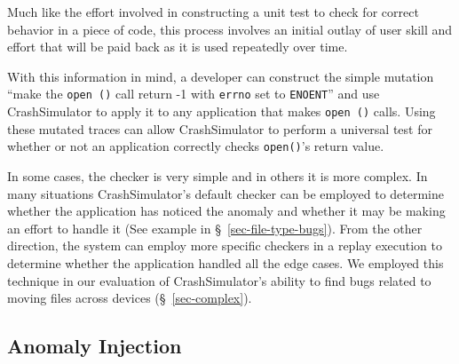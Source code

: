     Much like the effort involved in constructing a unit test to
    check for correct behavior in a piece of code, this
    process involves an initial outlay of user skill and effort that 
    will be paid back as it is used
    repeatedly over time.

    With this information in mind, a developer can construct the simple
    mutation ``make the {\tt open ()} call return -1 with {\tt errno} set to
    {\tt ENOENT}'' and use CrashSimulator to apply it to any application that
    makes {\tt open ()} calls.  Using these mutated traces can allow
    CrashSimulator to perform a universal test for whether or not an
    application correctly checks {\tt open()}'s return value.


    In some cases, %
    the checker is very simple and in others it is more complex.
   In many situations
    CrashSimulator's default checker can be employed to determine
    whether the application has noticed the anomaly and whether it may be making
    an effort to handle it (See example in
    \S~\ref{sec-file-type-bugs}).  From the other direction,
    the system can employ more specific checkers in a replay execution 
    to determine whether the application handled
    all the edge cases.  We employed this technique in our
    evaluation of CrashSimulator's ability to find bugs related to moving files across
    devices (\S~\ref{sec-complex}).
    
    \subsection{Anomaly Injection}

